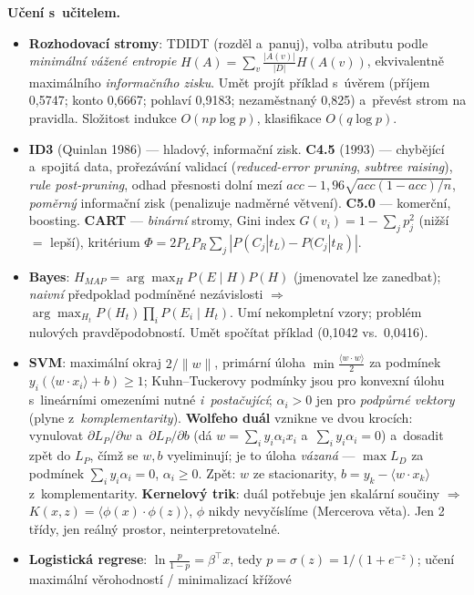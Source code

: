 \documentclass[11pt,a4paper]{article}
\theoremstyle{definition}
\begin{document}
\textbf{Učení s~učitelem.}
\begin{itemize}
\item \textbf{Rozhodovací stromy}: TDIDT (rozděl a~panuj), volba atributu podle
 \emph{minimální vážené entropie} $H(A)=\sum_v\frac{|A(v)|}{|D|}H(A(v))$, ekvivalentně
 maximálního \emph{informačního zisku}. Umět projít příklad s~úvěrem (příjem 0,5747;
 konto 0,6667; pohlaví 0,9183; nezaměstnaný 0,825) a~převést strom na pravidla.
 Složitost indukce $O(np\log p)$, klasifikace $O(q\log p)$.
\item \textbf{ID3} (Quinlan 1986) --- hladový, informační zisk. \textbf{C4.5} (1993) ---
 chybějící a~spojitá data, prořezávání validací (\emph{reduced-error pruning},
 \emph{subtree raising}), \emph{rule post-pruning}, odhad přesnosti dolní mezí
 $\mathit{acc}-1{,}96\sqrt{\mathit{acc}(1-\mathit{acc})/n}$, \emph{poměrný} informační
 zisk (penalizuje nadměrné větvení). \textbf{C5.0} --- komerční, boosting.
 \textbf{CART} --- \emph{binární} stromy, Gini index $G(v_i)=1-\sum_j p_j^2$ (nižší $=$
 lepší), kritérium $\Phi=2P_LP_R\sum_j|P(C_j|t_L)-P(C_j|t_R)|$.
\item \textbf{Bayes}: $H_{MAP}=\arg\max_H P(E\mid H)P(H)$ (jmenovatel lze zanedbat);
 \emph{naivní} předpoklad podmíněné nezávislosti $\Rightarrow$
 $\arg\max_{H_t}P(H_t)\prod_i P(E_i\mid H_t)$. Umí nekompletní vzory; problém nulových
 pravděpodobností. Umět spočítat příklad (0,1042 vs.\ 0,0416).
\item \textbf{SVM}: maximální okraj $2/\|w\|$, primární úloha $\min\frac{\langle w\cdot
 w\rangle}{2}$ za podmínek $y_i(\langle w\cdot x_i\rangle+b)\ge 1$; Kuhn--Tuckerovy
 podmínky jsou pro konvexní úlohu s~lineárními omezeními nutné \emph{i~postačující};
 $\alpha_i>0$ jen pro \emph{podpůrné vektory} (plyne z~\emph{komplementarity}).
 \textbf{Wolfeho duál} vznikne ve dvou krocích: vynulovat $\partial L_P/\partial w$
 a~$\partial L_P/\partial b$ (dá $w=\sum_i y_i\alpha_i x_i$ a~$\sum_i y_i\alpha_i=0$)
 a~dosadit zpět do $L_P$, čímž se $w,b$ vyeliminují; je to úloha \emph{vázaná}
 --- $\max L_D$ za podmínek $\sum_i y_i\alpha_i=0$, $\alpha_i\ge 0$. Zpět:
 $w$ ze stacionarity, $b=y_k-\langle w\cdot x_k\rangle$ z~komplementarity.
 \textbf{Kernelový trik}:
 duál potřebuje jen skalární součiny $\Rightarrow$ $K(x,z)=\langle\phi(x)\cdot\phi(z)\rangle$,
 $\phi$ nikdy nevyčíslíme (Mercerova věta). Jen 2 třídy, jen reálný prostor,
 neinterpretovatelné.
\item \textbf{Logistická regrese}: $\ln\frac{p}{1-p}=\beta^{\!\top}x$, tedy
 $p=\sigma(z)=1/(1+e^{-z})$; učení maximální věrohodností / minimalizací křížové

\end{itemize}
\end{document}
